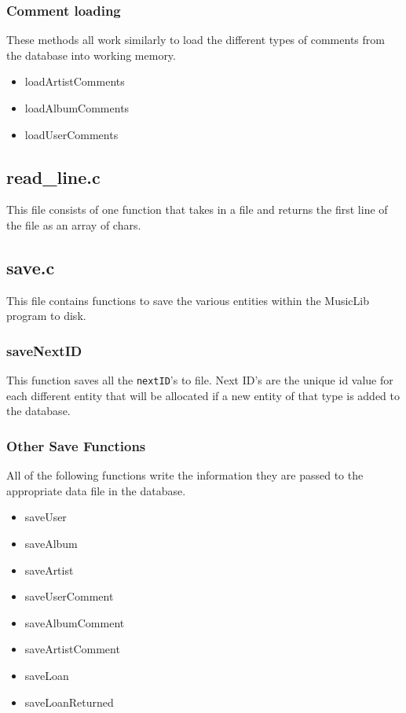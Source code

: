 \documentclass{article}
\begin{document}
\subsubsection*{Comment loading}
These methods all work similarly to load the different types of comments from the database into working memory.
\begin{itemize}
\item{loadArtistComments}
\item{loadAlbumComments}
\item{loadUserComments}
\end{itemize}

\subsection{read\_line.c}
This file consists of one function that takes in a file and returns the first line of the file as an array of chars.

\subsection{save.c}
This file contains functions to save the various entities within the MusicLib program to disk.

\subsubsection*{saveNextID}
This function saves all the \verb|nextID|'s to file. Next ID's are the unique id value for each different entity that will be allocated if a new entity of that type is added to the database.

\subsubsection*{Other Save Functions}
All of the following functions write the information they are passed to the appropriate data file in the database.
\begin{itemize}
\item{saveUser}
\item{saveAlbum}
\item{saveArtist}
\item{saveUserComment}
\item{saveAlbumComment}
\item{saveArtistComment}
\item{saveLoan}
\item{saveLoanReturned}
\end{itemize}
\end{document}
